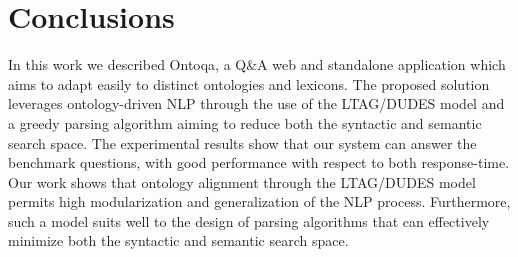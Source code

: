 \section{Conclusions}
\label{sec:conclusions}

In this work we described Ontoqa, a Q\&A web and standalone application which aims to adapt easily to distinct ontologies and lexicons.
%
The proposed solution leverages ontology-driven NLP through the use of the LTAG/DUDES model and a greedy parsing algorithm aiming to reduce both the syntactic and semantic search space.
%
%
The experimental results show that our system can answer the benchmark questions, with good performance with respect to both response-time.
%
%
Our work shows that ontology alignment through the LTAG/DUDES model permits 
high modularization and generalization of the NLP process.
%
Furthermore, such a model suits well to the design of parsing algorithms that can effectively minimize both the syntactic and semantic search space.
